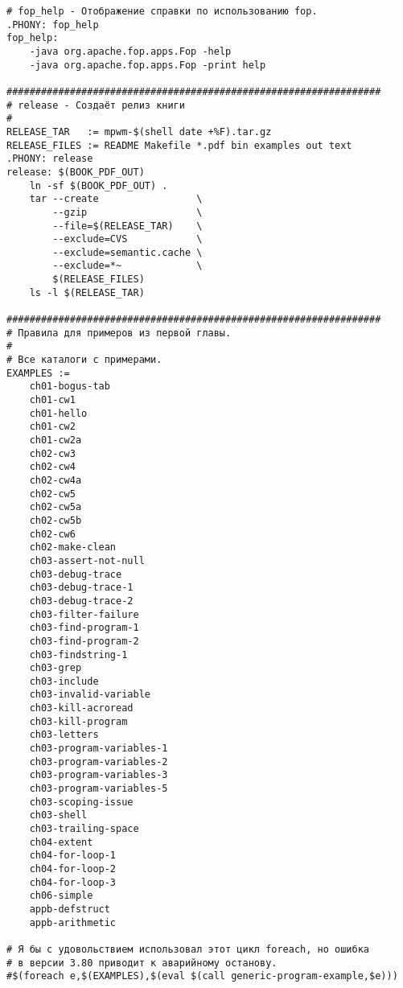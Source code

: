 \begin{verbatim}
# fop_help - Отображение справки по использованию fop.
.PHONY: fop_help
fop_help:
    -java org.apache.fop.apps.Fop -help
    -java org.apache.fop.apps.Fop -print help

#################################################################
# release - Создаёт релиз книги
#
RELEASE_TAR   := mpwm-$(shell date +%F).tar.gz
RELEASE_FILES := README Makefile *.pdf bin examples out text
.PHONY: release
release: $(BOOK_PDF_OUT)
    ln -sf $(BOOK_PDF_OUT) .
    tar --create                 \
        --gzip                   \
        --file=$(RELEASE_TAR)    \
        --exclude=CVS            \
        --exclude=semantic.cache \
        --exclude=*~             \
        $(RELEASE_FILES)
    ls -l $(RELEASE_TAR)

#################################################################
# Правила для примеров из первой главы.
#
# Все каталоги с примерами.
EXAMPLES :=
    ch01-bogus-tab
    ch01-cw1
    ch01-hello
    ch01-cw2
    ch01-cw2a
    ch02-cw3
    ch02-cw4
    ch02-cw4a
    ch02-cw5
    ch02-cw5a
    ch02-cw5b
    ch02-cw6
    ch02-make-clean
    ch03-assert-not-null
    ch03-debug-trace
    ch03-debug-trace-1
    ch03-debug-trace-2
    ch03-filter-failure
    ch03-find-program-1
    ch03-find-program-2
    ch03-findstring-1
    ch03-grep
    ch03-include
    ch03-invalid-variable
    ch03-kill-acroread
    ch03-kill-program
    ch03-letters
    ch03-program-variables-1
    ch03-program-variables-2
    ch03-program-variables-3
    ch03-program-variables-5
    ch03-scoping-issue
    ch03-shell
    ch03-trailing-space
    ch04-extent
    ch04-for-loop-1
    ch04-for-loop-2
    ch04-for-loop-3
    ch06-simple
    appb-defstruct
    appb-arithmetic

# Я бы с удовольствием использовал этот цикл foreach, но ошибка
# в версии 3.80 приводит к аварийному останову.
#$(foreach e,$(EXAMPLES),$(eval $(call generic-program-example,$e)))


\end{verbatim}
